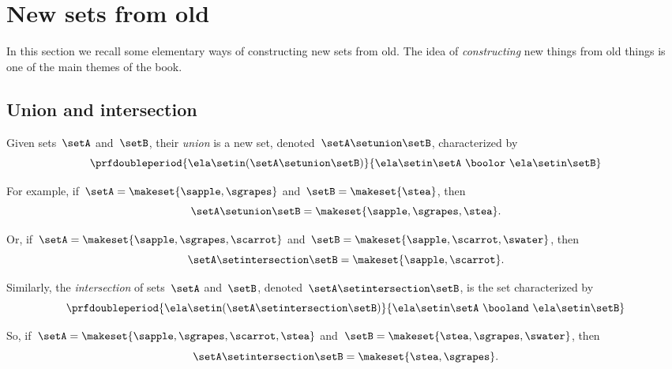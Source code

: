 
\section{New sets from old}

In this section we recall some elementary ways of constructing new sets from old.
%
The idea of \emph{constructing} new things from old things is one of the main themes of the book.

\subsection{Union and intersection}

Given sets~$\setA$ and~$\setB$, their \emph{union} is a new set, denoted~$\setA \setunion \setB$, characterized by
\begin{equation*}
    \prfdoubleperiod
    {\ela \setin(\setA \setunion \setB)}{\ela \setin\setA \ \boolor\  \ela \setin\setB}
\end{equation*}

For example, if~$\setA = \makeset{ \sapple, \sgrapes }$ and~$\setB = \makeset{ \stea }$, then
\begin{equation*}
    \setA \setunion \setB = \makeset{ \sapple, \sgrapes, \stea }.
\end{equation*}

Or, if~$\setA = \makeset{ \sapple, \sgrapes, \scarrot }$ and~$\setB = \makeset{ \sapple, \scarrot, \swater }$, then
\begin{equation*}
    \setA \setintersection \setB = \makeset{ \sapple, \scarrot }.
\end{equation*}

Similarly, the \emph{intersection} of sets~$\setA$ and~$\setB$, denoted~$\setA \setintersection \setB$, is the set characterized by
\begin{equation*}
    \prfdoubleperiod{ \ela \setin(\setA \setintersection \setB)}{\ela \setin\setA \ \booland\ \ela \setin\setB}
\end{equation*}

So, if~$\setA = \makeset{ \sapple, \sgrapes, \scarrot, \stea }$ and~$\setB = \makeset{ \stea, \sgrapes, \swater }$, then
\begin{equation*}
    \setA \setintersection \setB = \makeset{ \stea, \sgrapes }.
\end{equation*}


